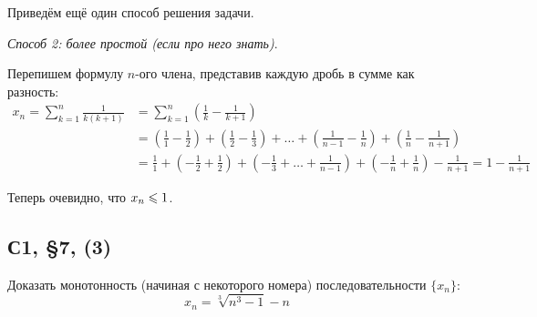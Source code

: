 \documentclass[a4paper,12pt]{article}
\begin{document}
\begin{solution}
    Приведём ещё один способ решения задачи.
    
    \medskip
    
    \emph{Способ 2: более простой (если про него знать)}.
    
    Перепишем формулу $n$-ого члена, представив каждую дробь в сумме как разность:
    \begin{equation*}
    \begin{split}
      x_n = \sum\limits_{k = 1}^n \frac{1}{k(k + 1)}
        &= \sum\limits_{k = 1}^n \left(\frac{1}{k} - \frac{1}{k + 1}\right)\\
        &= \left(\frac{1}{1} - \frac{1}{2}\right) + \left(\frac{1}{2} - \frac{1}{3}\right) + \ldots + \left(\frac{1}{n - 1} - \frac{1}{n}\right) + \left(\frac{1}{n} - \frac{1}{n + 1}\right)\\
        &= \frac{1}{1} + \left(-\frac{1}{2} + \frac{1}{2}\right) + \left(-\frac{1}{3}\right. + \ldots + \left.\frac{1}{n - 1}\right) + \left(-\frac{1}{n} + \frac{1}{n}\right) - \frac{1}{n + 1}
        = 1 - \frac{1}{n + 1}
    \end{split}
    \end{equation*}
    
    Теперь очевидно, что $x_n \hm\leq 1$.
  \end{solution}
  
  
  \subsection{С1, \S 7, (3)}
  
  Доказать монотонность (начиная с некоторого номера) последовательности $\{x_n\}$:
  \[
    x_n = \sqrt[3]{n^3 - 1} - n
  \]
  
\end{document}
